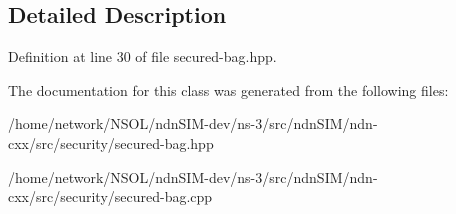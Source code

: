 \subsection{Detailed Description}


Definition at line 30 of file secured-\/bag.\+hpp.



The documentation for this class was generated from the following files\+:\begin{DoxyCompactItemize}
\item 
/home/network/\+N\+S\+O\+L/ndn\+S\+I\+M-\/dev/ns-\/3/src/ndn\+S\+I\+M/ndn-\/cxx/src/security/secured-\/bag.\+hpp\item 
/home/network/\+N\+S\+O\+L/ndn\+S\+I\+M-\/dev/ns-\/3/src/ndn\+S\+I\+M/ndn-\/cxx/src/security/secured-\/bag.\+cpp\end{DoxyCompactItemize}
